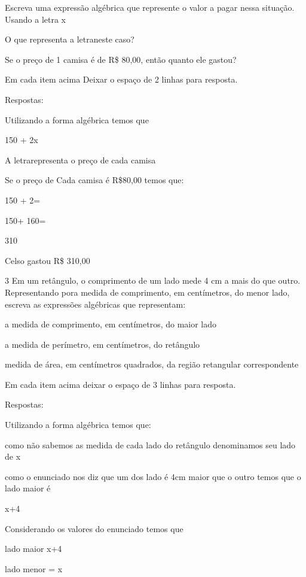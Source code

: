 \item Escreva uma expressão algébrica que represente o valor a pagar nessa
situação. Usando a letra x

\item O que representa a letra\times neste caso?
\item Se o preço de 1 camisa é de R\$ 80,00, então quanto ele gastou?

Em cada item acima Deixar o espaço de 2 linhas para resposta.

Respostas:

\item Utilizando a forma algébrica temos que

150 + 2x

\item A letra\times representa o preço de cada camisa
\item Se o preço de Cada camisa é R\$80,00 temos que:

150 + 2=

150+ 160=

310

Celso gastou R\$ 310,00

\num{3} Em um retângulo, o comprimento de um lado mede 4 cm a mais do que
outro. Representando por\times a medida de comprimento, em centímetros, do
menor lado, escreva as expressões algébricas que representam:

\item a medida de comprimento, em centímetros, do maior lado
\item a medida de perímetro, em centímetros, do retângulo
\item medida de área, em centímetros quadrados, da região retangular
correspondente

Em cada item acima deixar o espaço de 3 linhas para resposta.

Respostas:

\item Utilizando a forma algébrica temos que:

como não sabemos as medida de cada lado do retângulo denominamos seu
lado de x

como o enunciado nos diz que um dos lado é 4cm maior que o outro temos
que o lado maior é

x+4

\item Considerando os valores do enunciado temos que

lado maior x+4

lado menor = x

